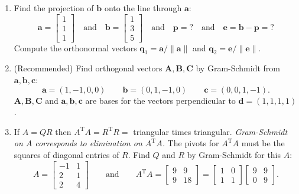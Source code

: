 \documentclass[14pt, a4paper]{article}
\begin{document}
\begin{enumerate}[resume]
    \item Find the projection of $\boldsymbol{b}$ onto the line through $\boldsymbol{a}$:
          \[
              \boldsymbol{a} = \begin{bmatrix} 1 \\ 1 \\ 1 \end{bmatrix} \quad \text{and} \quad \boldsymbol{b} = \begin{bmatrix} 1 \\ 3 \\ 5 \end{bmatrix} \quad \text{and} \quad \boldsymbol{p} = \text{?} \quad \text{and} \quad \boldsymbol{e} = \boldsymbol{b} - \boldsymbol{p} = \text{?}
          \]
          Compute the orthonormal vectors $\boldsymbol{q}_1 = \boldsymbol{a} / \|\boldsymbol{a}\|$ and $\boldsymbol{q}_2 = \boldsymbol{e} / \|\boldsymbol{e}\|$.

    \item (Recommended) Find orthogonal vectors $\boldsymbol{A}, \boldsymbol{B}, \boldsymbol{C}$ by Gram-Schmidt from $\boldsymbol{a}, \boldsymbol{b}, \boldsymbol{c}$:
          \[
              \boldsymbol{a} = (1, -1, 0, 0) \qquad \boldsymbol{b} = (0, 1, -1, 0) \qquad \boldsymbol{c} = (0, 0, 1, -1).
          \]
          $\boldsymbol{A}, \boldsymbol{B}, \boldsymbol{C}$ and $\boldsymbol{a}, \boldsymbol{b}, \boldsymbol{c}$ are bases for the vectors perpendicular to $\boldsymbol{d} = (1, 1, 1, 1)$.

    \item If $A = QR$ then $A^{\mathrm{T}}A = R^{\mathrm{T}}R =$ \underline{\hspace{2cm}} triangular times \underline{\hspace{2cm}} triangular. \emph{Gram-Schmidt on $A$ corresponds to elimination on $A^{\mathrm{T}}A$.} The pivots for $A^{\mathrm{T}}A$ must be the squares of diagonal entries of $R$. Find $Q$ and $R$ by Gram-Schmidt for this $A$:
          \[
              A = \begin{bmatrix} -1 & 1 \\ 2 & 1 \\ 2 & 4 \end{bmatrix} \qquad \text{and} \qquad
              A^{\mathrm{T}}A = \begin{bmatrix} 9 & 9 \\ 9 & 18 \end{bmatrix} = \begin{bmatrix} 1 & 0 \\ 1 & 1 \end{bmatrix} \begin{bmatrix} 9 & 9 \\ 0 & 9 \end{bmatrix}.
          \]


\end{enumerate}
\end{document}
